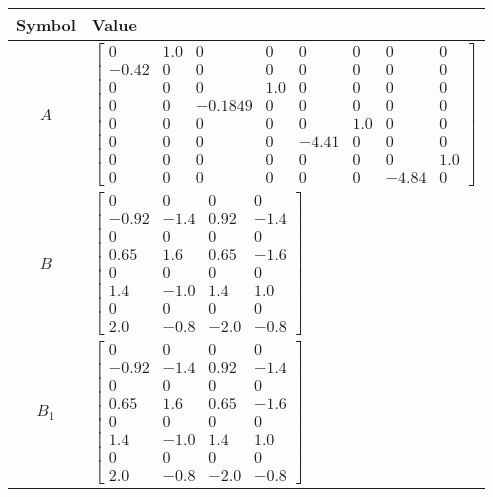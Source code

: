 \begin{tabular}{cl}
\hline
  Symbol  & Value                                                                                                                                                                                                                                                                                                                     \\
\hline
   $A$    & $\left[\begin{matrix}0 & 1.0 & 0 & 0 & 0 & 0 & 0 & 0\\-0.42 & 0 & 0 & 0 & 0 & 0 & 0 & 0\\0 & 0 & 0 & 1.0 & 0 & 0 & 0 & 0\\0 & 0 & -0.1849 & 0 & 0 & 0 & 0 & 0\\0 & 0 & 0 & 0 & 0 & 1.0 & 0 & 0\\0 & 0 & 0 & 0 & -4.41 & 0 & 0 & 0\\0 & 0 & 0 & 0 & 0 & 0 & 0 & 1.0\\0 & 0 & 0 & 0 & 0 & 0 & -4.84 & 0\end{matrix}\right]$ \\
   $B$    & $\left[\begin{matrix}0 & 0 & 0 & 0\\-0.92 & -1.4 & 0.92 & -1.4\\0 & 0 & 0 & 0\\0.65 & 1.6 & 0.65 & -1.6\\0 & 0 & 0 & 0\\1.4 & -1.0 & 1.4 & 1.0\\0 & 0 & 0 & 0\\2.0 & -0.8 & -2.0 & -0.8\end{matrix}\right]$                                                                                                               \\
 $B_{1}$  & $\left[\begin{matrix}0 & 0 & 0 & 0\\-0.92 & -1.4 & 0.92 & -1.4\\0 & 0 & 0 & 0\\0.65 & 1.6 & 0.65 & -1.6\\0 & 0 & 0 & 0\\1.4 & -1.0 & 1.4 & 1.0\\0 & 0 & 0 & 0\\2.0 & -0.8 & -2.0 & -0.8\end{matrix}\right]$                                                                                                               \\

\end{tabular}
